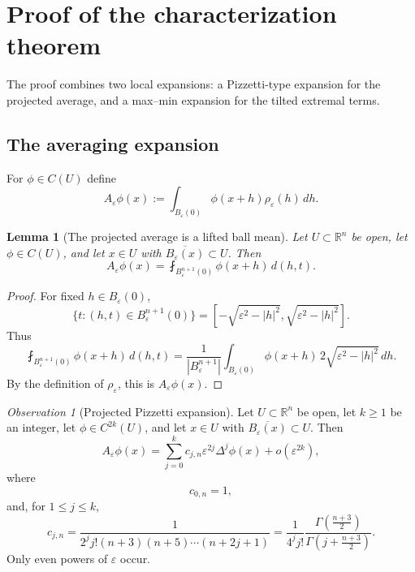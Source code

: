 \documentclass[12pt,reqno]{amsart}
\numberwithin{equation}{section}
\theoremstyle{plain}
\newtheorem{lemma}[lemma]{Lemma}
\theoremstyle{definition}
\theoremstyle{remark}
\newtheorem{observation}[observation]{Observation}
\newcommand{\R}{\mathbb{R}}
\newcommand{\rhoeps}{\rho_\varepsilon}
\begin{document}
\section{Proof of the characterization theorem}
\label{sec:proof}

The proof combines two local expansions: a Pizzetti-type expansion for
the projected average, and a max--min expansion for the tilted extremal
terms.

\subsection{The averaging expansion}
\label{subsec:p2}

For $\phi\in C(U)$ define
\[
  A_\varepsilon\phi(x)
  :=
  \int_{B_\varepsilon(0)}
  \phi(x+h)\rhoeps(h)\,dh .
\]

\begin{lemma}[The projected average is a lifted ball mean]
\label{lem:avg-lift}
Let $U\subset\R^n$ be open, let $\phi\in C(U)$, and let
$x\in U$ with $\overline{B_\varepsilon(x)}\subset U$. Then
\[
  A_\varepsilon\phi(x)
  =
  \fint_{B_\varepsilon^{n+1}(0)}
  \phi(x+h)\,d(h,t).
\]
\end{lemma}

\begin{proof}
For fixed $h\in B_\varepsilon(0)$,
\[
  \{t:(h,t)\in B_\varepsilon^{n+1}(0)\}
  =
  \left[
    -\sqrt{\varepsilon^2-|h|^2},
    \sqrt{\varepsilon^2-|h|^2}
  \right].
\]
Thus
\[
  \fint_{B_\varepsilon^{n+1}(0)}
  \phi(x+h)\,d(h,t)
  =
  \frac{1}{|B_\varepsilon^{n+1}|}
  \int_{B_\varepsilon(0)}
  \phi(x+h)\,2\sqrt{\varepsilon^2-|h|^2}\,dh.
\]
By the definition of $\rhoeps$, this is $A_\varepsilon\phi(x)$.
\end{proof}

\begin{observation}[Projected Pizzetti expansion]
\label{obs:pizzetti}
Let $U\subset\R^n$ be open, let $k\ge1$ be an integer, let
$\phi\in C^{2k}(U)$, and let $x\in U$ with
$\overline{B_\varepsilon(x)}\subset U$. Then
\begin{equation}\label{eq:pizzetti}
  A_\varepsilon\phi(x)
  =
  \sum_{j=0}^{k}
  c_{j,n}\varepsilon^{2j}\Delta^j\phi(x)
  +
  o(\varepsilon^{2k}),
\end{equation}
where
\[
  c_{0,n}=1,
\]
and, for $1\le j\le k$,
\begin{equation}\label{eq:pizzetti-coeff}
  c_{j,n}
  =
  \frac{1}
  {2^j j!(n+3)(n+5)\cdots(n+2j+1)}
  =
  \frac{1}{4^j j!}
  \frac{\Gamma\!\left(\frac{n+3}{2}\right)}
       {\Gamma\!\left(j+\frac{n+3}{2}\right)}.
\end{equation}
Only even powers of $\varepsilon$ occur.
\end{observation}
\end{document}
